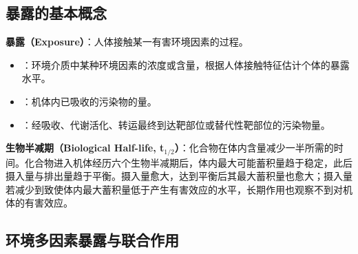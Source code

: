 \subsection{暴露的基本概念}

\begin{defbox}
\textbf{暴露（Exposure）}：人体接触某一有害环境因素的过程。
\end{defbox}

\begin{itemize}[leftmargin=*]
    \item {}：环境介质中某种环境因素的浓度或含量，根据人体接触特征估计个体的暴露水平。
    \item {}：机体内已吸收的污染物的量。
    \item {}：经吸收、代谢活化、转运最终到达靶部位或替代性靶部位的污染物量。
\end{itemize}

\begin{defbox}
\textbf{生物半减期（Biological Half-life, t$_{1/2}$）}：化合物在体内含量减少一半所需的时间。化合物进入机体经历六个生物半减期后，体内最大可能蓄积量趋于稳定，此后摄入量与排出量趋于平衡。摄入量愈大，达到平衡后其最大蓄积量也愈大；摄入量若减少到致使体内最大蓄积量低于产生有害效应的水平，长期作用也观察不到对机体的有害效应。
\end{defbox}

\subsection{环境多因素暴露与联合作用}

